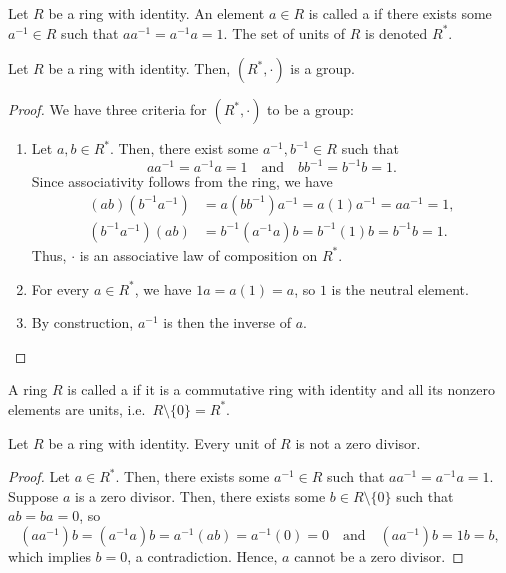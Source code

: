 \begin{defn}
Let $ R $ be a ring with identity. An element $ a\in R $ is called a  if there exists some $ a^{-1}\in R $ such that $ aa^{-1}=a^{-1}a=1 $. The set of units of $ R $ is denoted $ R^* $.
\end{defn}

\begin{prop}
Let $ R $ be a ring with identity. Then, $ (R^*,\cdot) $ is a group.
\end{prop}
\begin{proof}
We have three criteria for $ (R^*,\cdot) $ to be a group:
\begin{enumerate}
    \item Let $ a,b\in R^* $. Then, there exist some $ a^{-1},b^{-1}\in R $ such that
    \begin{equation*}
        aa^{-1}=a^{-1}a=1 \quad\text{and}\quad bb^{-1}=b^{-1}b=1.
    \end{equation*}
    Since associativity follows from the ring, we have
    \begin{align*}
        (ab)(b^{-1}a^{-1}) &= a(bb^{-1})a^{-1}=a(1)a^{-1}=aa^{-1}=1, \\
        (b^{-1}a^{-1})(ab) &= b^{-1}(a^{-1}a)b=b^{-1}(1)b=b^{-1}b=1.
    \end{align*}
    Thus, $ \cdot $ is an associative law of composition on $ R^* $.

    \item For every $ a\in R^* $, we have $ 1 a=a(1)=a $, so $ 1 $ is the neutral element.
    
    \item By construction, $ a^{-1} $ is then the inverse of $ a $.\qedhere
\end{enumerate}
\end{proof}

\begin{defn}
A ring $ R $ is called a  if it is a commutative ring with identity and all its nonzero elements are units, i.e.\ $ R\setminus\{0\}=R^* $.
\end{defn}

\begin{prop}
Let $ R $ be a ring with identity. Every unit of $ R $ is not a zero divisor.
\end{prop}
\begin{proof}
Let $ a\in R^* $. Then, there exists some $ a^{-1}\in R $ such that $ aa^{-1}=a^{-1}a=1 $. Suppose $ a $ is a zero divisor. Then, there exists some $ b\in R\setminus\{0\} $ such that $ ab=ba=0 $, so
\begin{equation*}
    (aa^{-1})b=(a^{-1}a)b=a^{-1}(ab)=a^{-1}(0)=0 \quad\text{and}\quad (aa^{-1})b=1b=b,
\end{equation*}
which implies $ b=0 $, a contradiction. Hence, $ a $ cannot be a zero divisor.
\end{proof}

